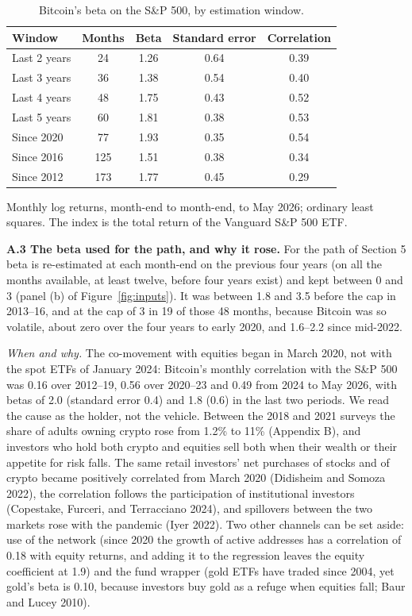 \documentclass[11pt]{article}
\begin{document}
\begin{table}[ht]\centering\small
\caption{Bitcoin's beta on the S\&P 500, by estimation window.}
\label{tab:betawin}
\begin{tabular}{lcccc}
\toprule
Window & Months & Beta & Standard error & Correlation \\
\midrule
Last 2 years & 24 & 1.26 & 0.64 & 0.39 \\
Last 3 years & 36 & 1.38 & 0.54 & 0.40 \\
Last 4 years & 48 & 1.75 & 0.43 & 0.52 \\
Last 5 years & 60 & 1.81 & 0.38 & 0.53 \\
Since 2020 & 77 & 1.93 & 0.35 & 0.54 \\
Since 2016 & 125 & 1.51 & 0.38 & 0.34 \\
Since 2012 & 173 & 1.77 & 0.45 & 0.29 \\
\bottomrule
\end{tabular}
\par\smallskip\parbox{0.7\textwidth}{\footnotesize Monthly log returns, month-end to month-end, to May 2026; ordinary least squares. The index is the total return of the Vanguard S\&P 500 ETF.}
\end{table}

\textbf{A.3 The beta used for the path, and why it rose.} For the path of Section 5 beta is re-estimated at each month-end on the previous four years (on all the months available, at least twelve, before four years exist) and kept between 0 and 3 (panel (b) of Figure~\ref{fig:inputs}). It was between 1.8 and 3.5 before the cap in 2013--16, and at the cap of 3 in 19 of those 48 months, because Bitcoin was so volatile, about zero over the four years to early 2020, and 1.6--2.2 since mid-2022.

\emph{When and why.} The co-movement with equities began in March 2020, not with the spot ETFs of January 2024: Bitcoin's monthly correlation with the S\&P 500 was 0.16 over 2012--19, 0.56 over 2020--23 and 0.49 from 2024 to May 2026, with betas of 2.0 (standard error 0.4) and 1.8 (0.6) in the last two periods. We read the cause as the holder, not the vehicle. Between the 2018 and 2021 surveys the share of adults owning crypto rose from 1.2\% to 11\% (Appendix B), and investors who hold both crypto and equities sell both when their wealth or their appetite for risk falls. The same retail investors' net purchases of stocks and of crypto became positively correlated from March 2020 (Didisheim and Somoza 2022), the correlation follows the participation of institutional investors (Copestake, Furceri, and Terracciano 2024), and spillovers between the two markets rose with the pandemic (Iyer 2022). Two other channels can be set aside: use of the network (since 2020 the growth of active addresses has a correlation of 0.18 with equity returns, and adding it to the regression leaves the equity coefficient at 1.9) and the fund wrapper (gold ETFs have traded since 2004, yet gold's beta is 0.10, because investors buy gold as a refuge when equities fall; Baur and Lucey 2010).
\end{document}
